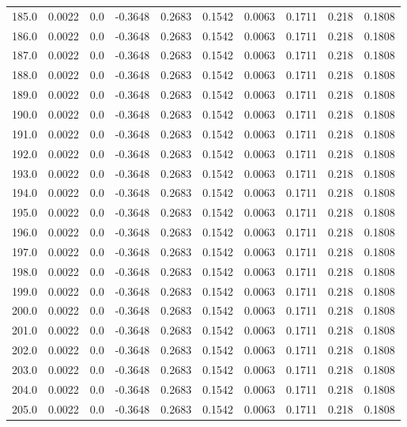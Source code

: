 \begin{longtable}{lrrrrrrrrr}
185.0 & 0.0022 & 0.0 & -0.3648 & 0.2683 & 0.1542 & 0.0063 & 0.1711 & 0.218 & 0.1808 \\
186.0 & 0.0022 & 0.0 & -0.3648 & 0.2683 & 0.1542 & 0.0063 & 0.1711 & 0.218 & 0.1808 \\
187.0 & 0.0022 & 0.0 & -0.3648 & 0.2683 & 0.1542 & 0.0063 & 0.1711 & 0.218 & 0.1808 \\
188.0 & 0.0022 & 0.0 & -0.3648 & 0.2683 & 0.1542 & 0.0063 & 0.1711 & 0.218 & 0.1808 \\
189.0 & 0.0022 & 0.0 & -0.3648 & 0.2683 & 0.1542 & 0.0063 & 0.1711 & 0.218 & 0.1808 \\
190.0 & 0.0022 & 0.0 & -0.3648 & 0.2683 & 0.1542 & 0.0063 & 0.1711 & 0.218 & 0.1808 \\
191.0 & 0.0022 & 0.0 & -0.3648 & 0.2683 & 0.1542 & 0.0063 & 0.1711 & 0.218 & 0.1808 \\
192.0 & 0.0022 & 0.0 & -0.3648 & 0.2683 & 0.1542 & 0.0063 & 0.1711 & 0.218 & 0.1808 \\
193.0 & 0.0022 & 0.0 & -0.3648 & 0.2683 & 0.1542 & 0.0063 & 0.1711 & 0.218 & 0.1808 \\
194.0 & 0.0022 & 0.0 & -0.3648 & 0.2683 & 0.1542 & 0.0063 & 0.1711 & 0.218 & 0.1808 \\
195.0 & 0.0022 & 0.0 & -0.3648 & 0.2683 & 0.1542 & 0.0063 & 0.1711 & 0.218 & 0.1808 \\
196.0 & 0.0022 & 0.0 & -0.3648 & 0.2683 & 0.1542 & 0.0063 & 0.1711 & 0.218 & 0.1808 \\
197.0 & 0.0022 & 0.0 & -0.3648 & 0.2683 & 0.1542 & 0.0063 & 0.1711 & 0.218 & 0.1808 \\
198.0 & 0.0022 & 0.0 & -0.3648 & 0.2683 & 0.1542 & 0.0063 & 0.1711 & 0.218 & 0.1808 \\
199.0 & 0.0022 & 0.0 & -0.3648 & 0.2683 & 0.1542 & 0.0063 & 0.1711 & 0.218 & 0.1808 \\
200.0 & 0.0022 & 0.0 & -0.3648 & 0.2683 & 0.1542 & 0.0063 & 0.1711 & 0.218 & 0.1808 \\
201.0 & 0.0022 & 0.0 & -0.3648 & 0.2683 & 0.1542 & 0.0063 & 0.1711 & 0.218 & 0.1808 \\
202.0 & 0.0022 & 0.0 & -0.3648 & 0.2683 & 0.1542 & 0.0063 & 0.1711 & 0.218 & 0.1808 \\
203.0 & 0.0022 & 0.0 & -0.3648 & 0.2683 & 0.1542 & 0.0063 & 0.1711 & 0.218 & 0.1808 \\
204.0 & 0.0022 & 0.0 & -0.3648 & 0.2683 & 0.1542 & 0.0063 & 0.1711 & 0.218 & 0.1808 \\
205.0 & 0.0022 & 0.0 & -0.3648 & 0.2683 & 0.1542 & 0.0063 & 0.1711 & 0.218 & 0.1808 \\

\end{longtable}
